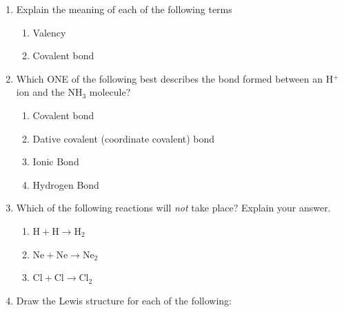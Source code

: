       \label{m38689*id147820}\begin{enumerate}[noitemsep, label=\textbf{\arabic*}. ] 
            \label{m38689*uid158}\item Explain the meaning of each of the following terms
\label{m38689*id147842}\begin{enumerate}[noitemsep, label=\textbf{\alph*}. ] 
            \label{m38689*uid159}\item Valency
\label{m38689*uid160}\item Covalent bond
\end{enumerate}
                \label{m38689*uid162}\item Which ONE of the following best describes the bond formed between an \begin{math}\mathrm{H}{}^{+}\end{math} ion and the \begin{math}\mathrm{NH}{}_{3}\end{math} molecule?
\label{m38689*id147923}\begin{enumerate}[noitemsep, label=\textbf{\alph*}. ] 
            \label{m38689*uid163}\item Covalent bond
\label{m38689*uid164}\item Dative covalent (coordinate covalent) bond
\label{m38689*uid165}\item Ionic Bond
\label{m38689*uid166}\item Hydrogen Bond
\end{enumerate}
                \label{m38689*uid171}\item Which of the following reactions will \textsl{not} take place? Explain your answer.
\label{m38689*id148047}\begin{enumerate}[noitemsep, label=\textbf{\alph*}. ] 
            \label{m38689*uid172}\item \begin{math}\mathrm{H}+\mathrm{H}\to {\mathrm{H}}_{2}\end{math}\label{m38689*uid173}\item \begin{math}\mathrm{Ne}+\mathrm{Ne}\to {\mathrm{Ne}}_{2}\end{math}\label{m38689*uid174}\item \begin{math}\mathrm{Cl}+\mathrm{Cl}\to {\mathrm{Cl}}_{2}\end{math}\end{enumerate}
                \label{m38689*uid175}\item Draw the Lewis structure for each of the following:

\end{enumerate}
